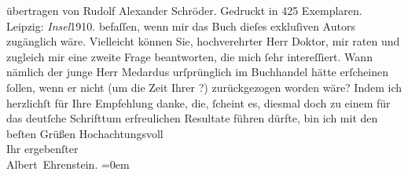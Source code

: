 \begin{ledgroupsized}[t]{13cm}
{{{                            übertragen von Rudolf Alexander
                                Schröder. Gedruckt in 425 Exemplaren. Leipzig: \emph{Insel}1910.}}}\label{K_L01912_3h} befaſſen, wenn mir das Buch dieſes exkluſiven Autors
                    zugänglich wäre. Vielleicht können Sie, hochverehrter Herr Doktor, mir raten und
                    zugleich mir eine zweite Frage beantworten, die mich ſehr intereſſiert. Wann
                    nämlich der junge Herr Medardus urſprünglich
                    im Buchhandel hätte erſcheinen ſollen, wenn er nicht (um die Zeit Ihrer \label{K_L01912_4v}\label{K_L01912_4h}?) zurückgezogen worden wäre?\pend
           \pstart
           Indem ich herzlichſt für Ihre Empfehlung danke, die, ſcheint es, diesmal doch zu
                    einem für das deutſche Schrifttum erfreulichen Resultate führen dürfte, bin ich mit den beſten
                    Grüßen\pend
           \pstart
           Hochachtungsvoll{\\[\baselineskip]}Ihr ergebenſter{\\[\baselineskip]}\spacefill\mbox{Albert Ehrenstein.}\pend
           \leftskip=0em{}
         
         \endnumbering{}\end{ledgroupsized}  \newcommand{\dateiname}{L01912}\newcommand{\titel}{Albert Ehrenstein an Arthur Schnitzler, 10. 2. 1910}\newcommand{\editorInnen}{Martin Anton Müller und Gerd-Hermann Susen}
      